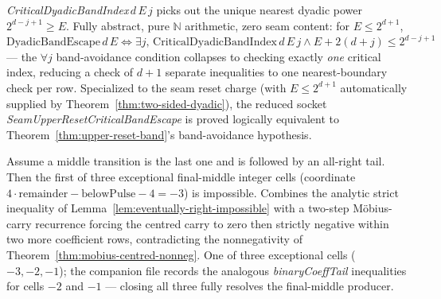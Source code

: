 \begin{thm}
\label{thm:critical-dyadic-band}
\emph{CriticalDyadicBandIndex}$\,d\,E\,j$ picks out the unique nearest dyadic power
$2^{d-j+1}\ge E$. Fully abstract, pure $\mathbb N$ arithmetic, zero seam content: for
$E\le 2^{d+1}$,
$\mathrm{DyadicBandEscape}\,d\,E \iff \exists j,\,\mathrm{CriticalDyadicBandIndex}\,d\,E\,j
\land E+2(d+j)\le 2^{d-j+1}$ — the $\forall j$ band-avoidance condition collapses to
checking exactly \emph{one} critical index, reducing a check of $d{+}1$ separate
inequalities to one nearest-boundary check per row. Specialized to the seam reset charge
(with $E\le 2^{d+1}$ automatically supplied by Theorem~\ref{thm:two-sided-dyadic}), the
reduced socket \emph{SeamUpperResetCriticalBandEscape} is proved logically equivalent to
Theorem~\ref{thm:upper-reset-band}'s band-avoidance hypothesis.
\par{}
\end{thm}

\begin{thm}
\label{thm:final-middle-cell}
Assume a middle transition is the last one and is followed by an all-right tail. Then the first
of three exceptional final-middle integer cells (coordinate
$4\cdot\mathrm{remainder}-\mathrm{belowPulse}-4=-3$) is impossible. Combines the analytic strict inequality of
Lemma~\ref{lem:eventually-right-impossible} with a two-step M\"obius-carry recurrence
forcing the centred carry to zero then strictly negative within two more coefficient
rows, contradicting the nonnegativity of Theorem~\ref{thm:mobius-centred-nonneg}. One of
three exceptional cells ($-3,-2,-1$); the companion file records the analogous
\emph{binaryCoeffTail} inequalities for cells $-2$ and $-1$ — closing all three fully
resolves the final-middle producer.
\par{}
\end{thm}

